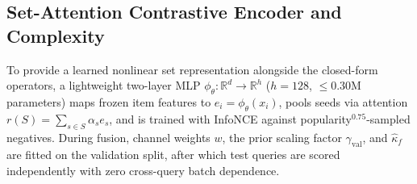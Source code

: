 \subsection{Set-Attention Contrastive Encoder and Complexity}
\label{sec:reasoner}
\label{sec:complexity}
To provide a learned nonlinear set representation alongside the closed-form operators, a lightweight two-layer
MLP $\phi_\theta:\mathbb{R}^d\to\mathbb{R}^h$ ($h=128$, $\le 0.30\text{M}$ parameters) maps frozen item features
to $e_i=\phi_\theta(x_i)$, pools seeds via attention $r(S)=\sum_{s\in S}\alpha_s e_s$, and is trained with
InfoNCE against popularity$^{0.75}$-sampled negatives. During fusion, channel weights $w$, the prior scaling
factor $\gamma_{\text{val}}$, and $\hat{\kappa}_f$ are fitted on the validation split, after which test queries
are scored independently with zero cross-query batch dependence.
